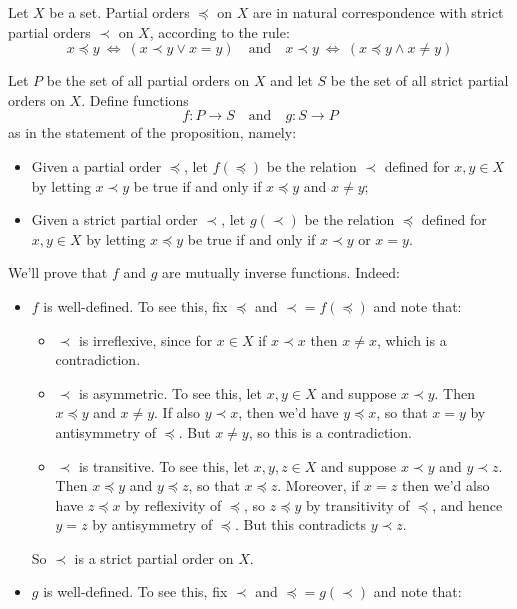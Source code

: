 \begin{proposition}
\label{propPartialOrdersCorrespondWithStrictPartialOrders}
Let $X$ be a set. Partial orders $\preceq$ on $X$ are in natural correspondence with strict partial orders $\prec$ on $X$, according to the rule:
\[ x \preceq y\ \Leftrightarrow\ (x \prec y \vee x=y) \quad \text{and} \quad x \prec y\ \Leftrightarrow\ (x \preceq y \wedge x \ne y) \]
\end{proposition}
\begin{cproof}
Let $P$ be the set of all partial orders on $X$ and let $S$ be the set of all strict partial orders on $X$. Define functions
\[ f : P \to S \quad \text{and} \quad g : S \to P \]
as in the statement of the proposition, namely:
\begin{itemize}
\item Given a partial order $\preceq$, let $f({\preceq})$ be the relation $\prec$ defined for $x,y \in X$ by letting $x \prec y$ be true if and only if $x \preceq y$ and $x \ne y$;
\item Given a strict partial order $\prec$, let $g({\prec})$ be the relation $\preceq$ defined for $x,y \in X$ by letting $x \preceq y$ be true if and only if $x \prec y$ or $x=y$.
\end{itemize}
We'll prove that $f$ and $g$ are mutually inverse functions. Indeed:
\begin{itemize}
\item $f$ is well-defined. To see this, fix $\preceq$ and ${\prec} = f({\preceq})$ and note that:
\begin{itemize}
\item $\prec$ is irreflexive, since for $x \in X$ if $x \prec x$ then $x \ne x$, which is a contradiction.
\item $\prec$ is asymmetric. To see this, let $x,y \in X$ and suppose $x \prec y$. Then $x \preceq y$ and $x \ne y$. If also $y \prec x$, then we'd have $y \preceq x$, so that $x=y$ by antisymmetry of $\preceq$. But $x \ne y$, so this is a contradiction.
\item $\prec$ is transitive. To see this, let $x,y,z \in X$ and suppose $x \prec y$ and $y \prec z$. Then $x \preceq y$ and $y \preceq z$, so that $x \preceq z$. Moreover, if $x=z$ then we'd also have $z \preceq x$ by reflexivity of $\preceq$, so $z \preceq y$ by transitivity of $\preceq$, and hence $y=z$ by antisymmetry of $\preceq$. But this contradicts $y \prec z$.
\end{itemize}
So $\prec$ is a strict partial order on $X$.
\item $g$ is well-defined. To see this, fix $\prec$ and ${\preceq} = g({\prec})$ and note that:

\end{itemize}
\end{cproof}
